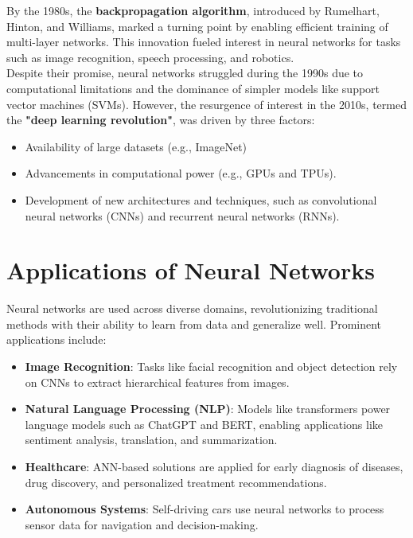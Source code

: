 By the 1980s, the \textbf{backpropagation algorithm}, introduced by Rumelhart, Hinton, and Williams, marked a turning point by enabling efficient training of multi-layer networks.\cite{rumelhart1986learning} This innovation fueled interest in neural networks for tasks such as image recognition, speech processing, and robotics.\\

Despite their promise, neural networks struggled during the 1990s due to computational limitations and the dominance of simpler models like support vector machines (SVMs). However, the resurgence of interest in the 2010s, termed the \textbf{"deep learning revolution"}, was driven by three factors:
\begin{itemize}
    \item Availability of large datasets (e.g., ImageNet)
    \item Advancements in computational power (e.g., GPUs and TPUs).
    \item Development of new architectures and techniques, such as convolutional neural networks (CNNs) and recurrent neural networks (RNNs).\cite{lecun2015deep}\cite{krizhevsky2012imagenet}
\end{itemize}

\section{Applications of Neural Networks}
Neural networks are used across diverse domains, revolutionizing traditional methods with their ability to learn from data and generalize well. Prominent applications include:
\begin{itemize}
    \item \textbf{Image Recognition}: Tasks like facial recognition and object detection rely on CNNs to extract hierarchical features from images.\cite{lecun2015deep}
    \item \textbf{Natural Language Processing (NLP)}: Models like transformers power language models such as ChatGPT and BERT, enabling applications like sentiment analysis, translation, and summarization.\cite{vaswani2017attention}
    \item \textbf{Healthcare}: ANN-based solutions are applied for early diagnosis of diseases, drug discovery, and personalized treatment recommendations.\cite{esteva2017dermatologist}
    \item \textbf{Autonomous Systems}: Self-driving cars use neural networks to process sensor data for navigation and decision-making.\cite{bojarski2016end}
\end{itemize}

